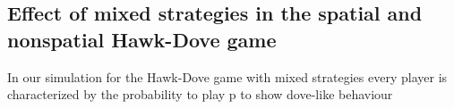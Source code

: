 \subsection{Effect of mixed strategies in the spatial and nonspatial Hawk-Dove game}
In our simulation for the Hawk-Dove game with mixed strategies every player is characterized by the probability to play p to show dove-like behaviour


